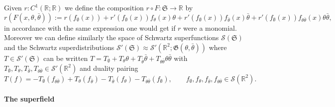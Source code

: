 \documentclass[a4paper,10pt]{article}
\newcommand{\assign}{:=}
\begin{document}
Given $r : C^1 (\mathbb{R}; \mathbb{R})$ we define the composition $r \circ F
: \mathfrak{S} \rightarrow \mathbb{R}$ by
\[ r (F (x, \theta, \bar{\theta})) \assign r (f_{\emptyset} (x)) + r'
   (f_{\emptyset} (x)) f_{\theta} (x) \theta + r' (f_{\emptyset} (x))
   f_{\bar{\theta}} (x) \bar{\theta} + r' (f_{\emptyset} (x)) f_{\theta
   \bar{\theta}} (x) \theta \bar{\theta}, \]
in accordance with the same expression one would get if $r$ were a monomial.
Moreover we can define similarly the space of Schwartz superfunctions
$\mathcal{S} (\mathfrak{S})$ and the Schwartz superdistributions $\mathcal{S}'
(\mathfrak{S}) \approx \mathcal{S}' (\mathbb{R}^2 ; \mathfrak{G} (\theta,
\bar{\theta}))$ where $T \in \mathcal{S}' (\mathfrak{S})$ can be written $T =
T_{\emptyset} + T_{\theta} \theta + T_{\bar{\theta}} \bar{\theta} + T_{\theta
\bar{\theta}} \theta \bar{\theta}$ with $T_{\emptyset}, T_{\theta},
T_{\bar{\theta}}, T_{\theta \bar{\theta}} \in \mathcal{S}' (\mathbb{R}^2)$ and
duality pairing
\[ T (f) = - T_{\emptyset} (f_{\theta \bar{\theta}}) + T_{\theta}
   (f_{\bar{\theta}}) - T_{\bar{\theta}} (f_{\theta}) - T_{\theta
   \bar{\theta}} (f_{\emptyset}), \qquad f_{\emptyset}, f_{\theta},
   f_{\bar{\theta}}, f_{\theta \bar{\theta}} \in \mathcal{S} (\mathbb{R}^2) .
\]

\paragraph{The superfield}
\end{document}
